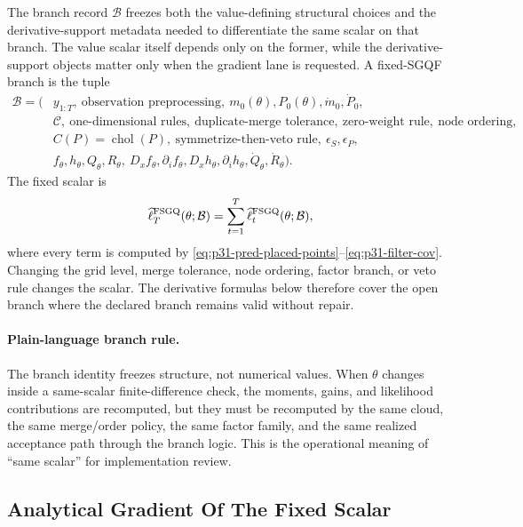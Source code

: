 \documentclass[11pt]{article}
\numberwithin{equation}{section}
\newcommand{\chol}{\operatorname{chol}}
\newcommand{\ellhat}{\widehat\ell}
\begin{document}
The branch record \(\mathcal B\) freezes both the value-defining structural
choices and the derivative-support metadata needed to differentiate the same
scalar on that branch.  The value scalar itself depends only on the former, while
the derivative-support objects matter only when the gradient lane is requested.
A fixed-SGQF branch is the tuple
\begin{equation}
\begin{aligned}
  \mathcal B
  =
  (&y_{1:T},\ \text{observation preprocessing},\
  m_0(\theta),P_0(\theta),\dot m_0,\dot P_0,\\
  &\mathcal C,\ \text{one-dimensional rules},\
  \text{duplicate-merge tolerance},\
  \text{zero-weight rule},\
  \text{node ordering},\\
  &C(P)=\chol(P),\
  \text{symmetrize-then-veto rule},\
  \epsilon_S,\epsilon_P,\\
  &f_\theta,h_\theta,Q_\theta,R_\theta,\
  D_xf_\theta,\partial_i f_\theta,
  D_xh_\theta,\partial_i h_\theta,\dot Q_\theta,\dot R_\theta).
\end{aligned}
  \label{eq:p31-branch-tuple}
\end{equation}
The fixed scalar is
\begin{equation}
  \ellhat_T^{\rm FSGQ}(\theta;\mathcal B)
  =
  \sum_{t=1}^T \ellhat_t^{\rm FSGQ}(\theta;\mathcal B),
  \label{eq:p31-fixed-scalar}
\end{equation}
where every term is computed by
\eqref{eq:p31-pred-placed-points}--\eqref{eq:p31-filter-cov}.  Changing the
grid level, merge tolerance, node ordering, factor branch, or veto rule changes
the scalar.  The derivative formulas below therefore cover the open branch where
the declared branch remains valid without repair.

\paragraph{Plain-language branch rule.}
The branch identity freezes structure, not numerical values.  When \(\theta\)
changes inside a same-scalar finite-difference check, the moments, gains, and
likelihood contributions are recomputed, but they must be recomputed by the same
cloud, the same merge/order policy, the same factor family, and the same realized
acceptance path through the branch logic.  This is the operational meaning of
``same scalar'' for implementation review.

\subsection{Analytical Gradient Of The Fixed Scalar}
\label{sec:p31-gradient}
\end{document}
